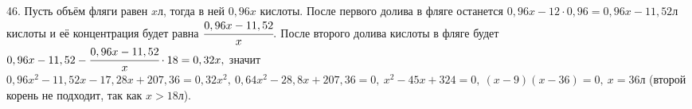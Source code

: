 46. Пусть объём фляги равен $x$л, тогда в ней $0,96x$ кислоты. После первого долива в фляге останется $0,96x-12\cdot0,96=0,96x-11,52$л кислоты и её концентрация будет равна $\cfrac{0,96x-11,52}{x}.$ После второго долива кислоты в фляге будет $0,96x-11,52-\cfrac{0,96x-11,52}{x}\cdot18=0,32x,$ значит $0,96x^2-11,52x-17,28x+207,36=0,32x^2,\ 0,64x^2-28,8x+207,36=0,\ x^2-45x+324=0,\ (x-9)(x-36)=0,\ x=36$л (второй корень не подходит, так как $x>18$л).\\
